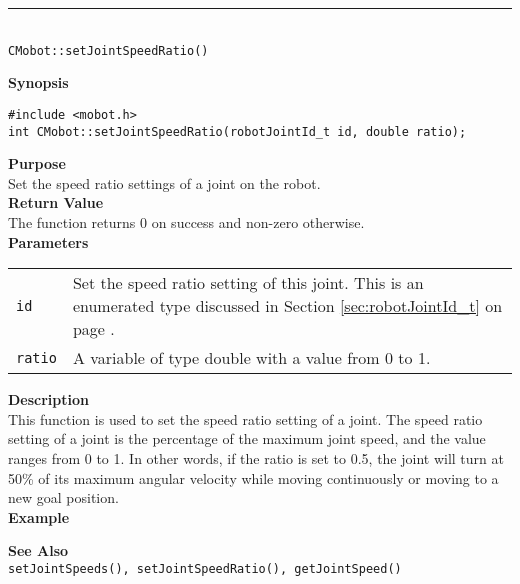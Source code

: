 \noindent
\vspace{5pt}
\rule{4.5in}{0.015in}\\
\noindent
{\LARGE \texttt{CMobot::setJointSpeedRatio()}}\\
{}

\noindent
{\bf Synopsis}\\
\begin{verbatim}
#include <mobot.h>
int CMobot::setJointSpeedRatio(robotJointId_t id, double ratio);
\end{verbatim}

\noindent
{\bf Purpose}\\
Set the speed ratio settings of a joint on the robot.\\

\noindent
{\bf Return Value}\\
The function returns 0 on success and non-zero otherwise.\\

\noindent
{\bf Parameters}
\vspace{-0.1in}
\begin{description}
\item               
\begin{tabular}{p{10 mm}p{145 mm}}
\texttt{id} & Set the speed ratio setting of this joint. This is an 
enumerated type discussed in Section \ref{sec:robotJointId_t} on page
\pageref{sec:robotJointId_t}.\\
\texttt{ratio} & A variable of type double with a value from 0 to 1. 
\end{tabular}
\end{description}

\noindent
{\bf Description}\\
This function is used to set the speed ratio setting of a joint. The speed
ratio setting of a joint is the percentage of the maximum joint speed, and the
value ranges from 0 to 1. In other words, if the ratio is set to 0.5, the joint 
will turn at 50\% of its maximum angular velocity while moving continuously
or moving to a new goal position.\\

\noindent
{\bf Example}\\
\noindent

\noindent
{\bf See Also}\\
\texttt{setJointSpeeds(), setJointSpeedRatio(), getJointSpeed()}

